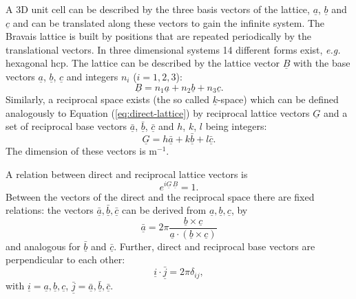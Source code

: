 \documentclass[11pt,DIV=13,BCOR=5mm,a4paper,headinclude]{scrbook}
\renewcommand{\vec}[1]{\underline{#1}}
\begin{document}
A 3D unit cell can be described by the three basis vectors of the lattice, $\vec{a}$, $\vec{b}$ and $\vec{c}$ and can be translated along these vectors to gain the infinite system\cite{jensen}.
The Bravais lattice is built by positions that are repeated periodically by the translational vectors.
In three dimensional systems 14 different forms exist, \textit{e.g.} hexagonal hcp.
The lattice can be described by the lattice vector $\vec{B}$ with the base vectors $\vec{a}$, $\vec{b}$, $\vec{c}$ and integers $n_i$ ($i=1,2,3$):
\begin{equation}\label{eq:direct-lattice}
 \vec{B}=n_1\vec{a}+n_2\vec{b}+n_3\vec{c}.
\end{equation}
Similarly, a reciprocal space exists (the so called $\vec{k}$-space) which can be defined analogously to Equation (\ref{eq:direct-lattice}) by reciprocal lattice vectors $\vec{G}$ and a set of reciprocal base vectors $\bar{\vec{a}}$, $\bar{\vec{b}}$, $\bar{\vec{c}}$ and $h$, $k$, $l$ being integers:
\begin{equation}\label{eq:rec_latt_vec}
 \vec{G}=h\bar{\vec{a}}+k\bar{\vec{b}}+l\bar{\vec{c}}.
\end{equation}
The dimension of these vectors is m$^{-1}$.

A relation between direct and reciprocal lattice vectors is
\begin{equation}
 e^{i\vec{G}\,\vec{B}}=1.
\end{equation}
Between the vectors of the direct and the reciprocal space there are fixed relations: the vectors $\bar{\vec{a}},\bar{\vec{b}},\bar{\vec{c}}$  can be derived from $\vec{a},\vec{b},\vec{c}$, by
\begin{equation}
\bar{\vec{a}}=2\pi\frac{\vec{b} \times \vec{c}}{\vec{a}\cdot(\vec{b} \times \vec{c})} 
\end{equation}
and analogous for $\bar{\vec{b}}$ and $\bar{\vec{c}}$.
Further, direct and reciprocal base vectors are perpendicular to each other:
\begin{equation}
 \vec{i}\cdot\bar{\vec{j}}=2\pi\delta_{ij},
\end{equation} 
with $\vec{i}=\vec{a}, \vec{b}, \vec{c}$, $\bar{\vec{j}}=\bar{\vec{a}},\bar{\vec{b}},\bar{\vec{c}}$. %
\end{document}
